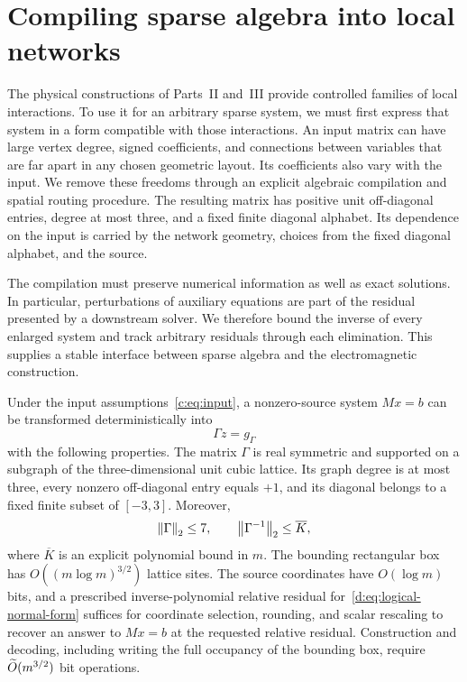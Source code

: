 \section{Compiling sparse algebra into local networks}
\label{d:sec:logical}

The physical constructions of Parts~II and~III provide controlled
families of local interactions. To use it for an arbitrary sparse system, we
must first express that system in a form compatible with those interactions.
An input matrix can have large vertex degree, signed coefficients, and
connections between variables that are far apart in any chosen geometric
layout. Its coefficients also vary with the input. We remove these freedoms
through an explicit algebraic compilation and spatial routing procedure.
The resulting matrix has positive unit off-diagonal entries, degree at most
three, and a fixed finite diagonal alphabet. Its dependence on the input is
carried by the network geometry, choices from the fixed diagonal alphabet,
and the source.

The compilation must preserve numerical information as well as exact
solutions. In particular, perturbations of auxiliary equations are part of
the residual presented by a downstream solver. We therefore bound the
inverse of every enlarged system and track arbitrary residuals through
each elimination. This supplies a stable interface between sparse algebra
and the electromagnetic construction.

\begin{proposition}
\label{d:thm:logical}
Under the input assumptions~\eqref{c:eq:input}, a nonzero-source system
$Mx=b$ can be transformed deterministically into
\begin{equation}
    \Gamma z=g_\Gamma
    \label{d:eq:logical-normal-form}
\end{equation}
with the following properties. The matrix $\Gamma$ is real symmetric and
supported on a subgraph of the three-dimensional unit cubic lattice. Its
graph degree is at most three, every nonzero off-diagonal entry equals
$+1$, and its diagonal belongs to a fixed finite subset of $[-3,3]$.
Moreover,
\begin{equation}
    \left\lVert \Gamma\right\rVert_2\le 7,
    \qquad
    \left\lVert \Gamma^{-1}\right\rVert_2\le \overline K,
    \label{d:eq:logical-norms}
\end{equation}
where $\overline K$ is an explicit polynomial bound in $m$.
The bounding rectangular box has $O((m\log m)^{3/2})$ lattice sites.
The source coordinates have $O(\log m)$ bits, and a prescribed
inverse-polynomial relative residual for~\eqref{d:eq:logical-normal-form}
suffices for coordinate selection, rounding, and scalar rescaling to
recover an answer to $Mx=b$ at the requested relative residual.
Construction and decoding, including writing the full occupancy of the
bounding box, require $\widetilde O(m^{3/2})$ bit operations.
\end{proposition}


